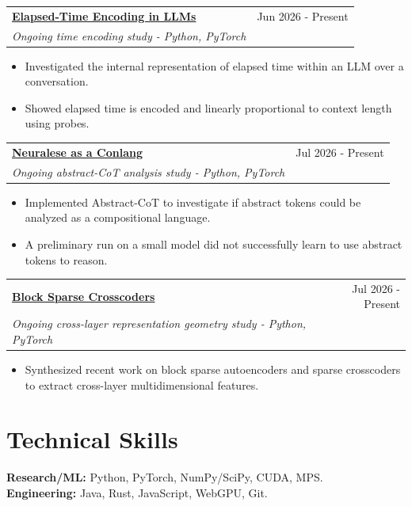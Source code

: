 \documentclass[10pt,letterpaper]{article}
\makeatletter
\newcommand{\entry}[4]{%
  \noindent\begin{tabularx}{\linewidth}{@{}X r@{}}
    \textbf{\href{#2}{#1}} & \textcolor{muted}{\small #4} \\
    \textit{#3} & \\
  \end{tabularx}\vspace{-1pt}%
}
\makeatother
\begin{document}
\entry{Elapsed-Time Encoding in LLMs}{https://github.com/a9lim/time-experiment}{Ongoing time encoding study - Python, PyTorch}{Jun 2026 - Present}
\begin{itemize}
  \item Investigated the internal representation of elapsed time within an LLM over a conversation.
  \item Showed elapsed time is encoded and linearly proportional to context length using probes.
\end{itemize}

\entry{Neuralese as a Conlang}{https://github.com/a9lim/acot-experiment}{Ongoing abstract-CoT analysis study - Python, PyTorch}{Jul 2026 - Present}
\begin{itemize}
  \item Implemented Abstract-CoT to investigate if abstract tokens could be analyzed as a compositional language.
  \item A preliminary run on a small model did not successfully learn to use abstract tokens to reason.
\end{itemize}

\entry{Block Sparse Crosscoders}{https://github.com/a9lim/block-crosscoder-experiment}{Ongoing cross-layer representation geometry study - Python, PyTorch}{Jul 2026 - Present}
\begin{itemize}
  \item Synthesized recent work on block sparse autoencoders and sparse crosscoders to extract cross-layer multidimensional features.
\end{itemize}

\section*{Technical Skills}

{\small
\textbf{Research/ML:} Python, PyTorch, NumPy/SciPy, CUDA, MPS.\\
\textbf{Engineering:} Java, Rust, JavaScript, WebGPU, Git.
}
\end{document}
